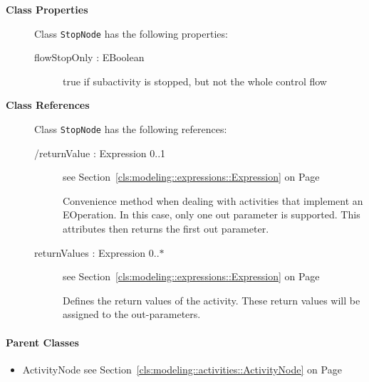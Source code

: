 \begin{description}

	\item[\textbf{Class Properties}] Class \texttt{StopNode} has the following properties:
	\begin{description}
\item[flowStopOnly : EBoolean 	]

\hspace{\fill}
\nopagebreak


	
			
true if subactivity is stopped, but not the whole control flow	
		
	
	\end{description}
	
	\item[\textbf{Class References}] Class \texttt{StopNode} has the following references:
	\begin{description}
\item[/returnValue : Expression 			0..1]
see Section~\ref{cls:modeling::expressions::Expression} on Page~\pageref{cls:modeling::expressions::Expression}
\hspace{\fill}
\nopagebreak


	
			
Convenience method when dealing with activities that implement an EOperation. In this case, only one out parameter is supported. This attributes then returns the first out parameter.	
		
	
\item[returnValues : Expression 			0..$*$]
see Section~\ref{cls:modeling::expressions::Expression} on Page~\pageref{cls:modeling::expressions::Expression}
\hspace{\fill}
\nopagebreak


	
			
Defines the return values of the activity. These return values will be assigned to the out-parameters.	
		
	
	\end{description}
	

\end{description}

\paragraph{Parent Classes}
\begin{itemize}
\item ActivityNode see Section~\ref{cls:modeling::activities::ActivityNode} on Page~\pageref{cls:modeling::activities::ActivityNode}\end{itemize}
